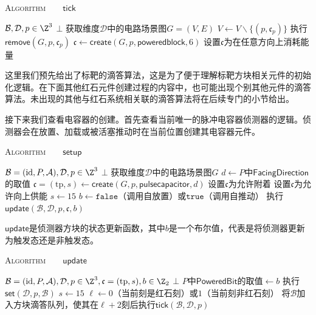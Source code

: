 \documentclass[a4,11pt]{aleph-notas}
\begin{document}
\begin{codigo}
\textsc{Algorithm}\ \ \ \ $\mathsf{tick}$
\begin{algorithmic}[1]
    \Require $\mathcal{B},\mathcal{D},p\in\Z^3$
    \Ensure $\bot$
    \State 获取维度$\mathcal{D}$中的电路场景图$G=(V,E)$
    \State $V\gets V\backslash\{(p,\mathfrak{c}_p)\}$
    \State 执行$\mathsf{remove}(G,p,\mathfrak{c}_p)$
    \State $\mathfrak{c}\gets\mathsf{create}(G,p,\mathsf{poweredblock},6)$
    \State 设置$\mathfrak{c}$为在任意方向上消耗能量
    \State \Return
\end{algorithmic}
\end{codigo}

这里我们预先给出了标靶的滴答算法，这是为了便于理解标靶方块相关元件的初始化逻辑。在下面其他红石元件创建过程的内容中，也可能出现个别其他元件的滴答算法。未出现的其他与红石系统相关联的滴答算法将在后续专门的小节给出。

接下来我们查看电容器的创建。首先查看当前唯一的脉冲电容器侦测器的逻辑。侦测器会在放置、加载或被活塞推动时在当前位置创建其电容器元件。

\begin{codigo}
\textsc{Algorithm}\ \ \ \ $\mathsf{setup}$
\begin{algorithmic}[1]
    \Require $\mathcal{B}=(\mathrm{id},P,\mathcal{A}),\mathcal{D},p\in\Z^3$
    \Ensure $\bot$
    \State 获取维度$\mathcal{D}$中的电路场景图$G$
    \State $d\gets P$中$\mathsf{FacingDirection}$的取值
    \State $\mathfrak{c}=(\mathrm{tp},s)\gets\mathsf{create}(G,p,\mathsf{pulsecapacitor},d)$
    \State 设置$\mathfrak{c}$为允许附着
    \State 设置$\mathfrak{c}$为允许向上供能
            \State $s\gets15$
        \EndIf
    \Else
        \State $b\gets\mathtt{false}$（调用自放置）或$\mathtt{true}$（调用自推动）
        \State 执行$\mathsf{update}(\mathcal{B},\mathcal{D},p,\mathfrak{c},b)$
    \EndIf
    \State \Return
\end{algorithmic}
\end{codigo}

$\mathsf{update}$是侦测器方块的状态更新函数，其中$b$是一个布尔值，代表是将侦测器更新为触发态还是非触发态。

\begin{codigo}
\textsc{Algorithm}\ \ \ \ $\mathsf{update}$
\begin{algorithmic}[1]
    \Require $\mathcal{B}=(\mathrm{id},P,\mathcal{A}),\mathcal{D},p\in\Z^3,\mathfrak{c}=(\mathrm{tp},s),b\in\Z_2$
    \Ensure $\bot$
    \State $P$中$\mathsf{PoweredBit}$的取值$\gets b$
    \State 执行$\mathsf{set}(\mathcal{D},p,\mathcal{B})$
        \State $s\gets15$
            \State \Return
        \EndIf
        \State $\ell\gets0$（当前刻是红石刻）或$1$（当前刻非红石刻）
        \State 将$\mathcal{B}$加入方块滴答队列，使其在$\ell+2$刻后执行$\mathsf{tick}(\mathcal{B},\mathcal{D},p)$
    \EndIf
    \State \Return
\end{algorithmic}
\end{codigo}
\end{document}
